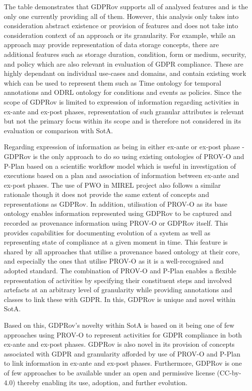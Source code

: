 The table demonstrates that GDPRov supports all of analysed features and is the only one currently providing all of them. However, this analysis only takes into consideration abstract existence or provision of features and does not take into consideration context of an approach or its granularity. For example, while an approach may provide representation of data storage concepts, there are additional features such as storage duration, condition, form or medium, security, and policy which are also relevant in evaluation of GDPR compliance.
These are highly dependant on individual use-cases and domains, and contain existing work which can be used to represent them such as Time ontology \cite{cox_time_2017} for temporal annotations and ODRL ontology \cite{iannella_odrl_2018} for conditions and events as policies.
Since the scope of GDPRov is limited to expression of information regarding activities in ex-ante and ex-post phases, representation of such granular attributes is relevant but not the primary focus within its scope and is therefore not considered in its evaluation or comparison with SotA.

Regarding expression of information as being in either ex-ante or ex-post phase - GDPRov is the only approach to do so using existing ontologies of PROV-O and P-Plan based on a scientific workflow model which is useful in investigation of executions based on a plan and association of information between ex-ante and ex-post phases. The use of PWO \cite{gangemi_publishing_2017} in MIREL project also follows a similar rationale though it does not provide the same extent of concepts and representations as GDPRov.
In addition, utilisation of PROV-O as its base ontology enables information represented using GDPRov to be captured and recorded as provenance information using PROV-O or GDPRov itself. This provides capabilities for documenting evolution of a system as well as representing state of compliance at a given moment in time.
This feature is shared by all approaches that utilise a provenance based ontology at their core, and especially the ones that utilise PROV-O as it is a well-recognised and adopted standard.
The combination of PROV-O and P-Plan enables a flexible representation of activities by specifying their constituent steps and involved artefacts at an arbitrary level of granularity while providing annotations and classes to link these with GDPR. In this, GDPRov is unique and novel within SotA.

Based on this, GDPRov's novelty within SotA is based on it being one of few approaches using PROV-O to represent activities for GDPR compliance in both ex-ante and ex-post phases. GDPRov is also novel in its provision of concepts associated with GDPR and granularity afforded by use of PROV-O and P-Plan to link information in ex-ante and ex-post phases.
Furthermore, GDPRov is one of few approaches to be available under an open and permissive license (CC-by-4.0) thereby enabling its use, adoption, and further evolution.

